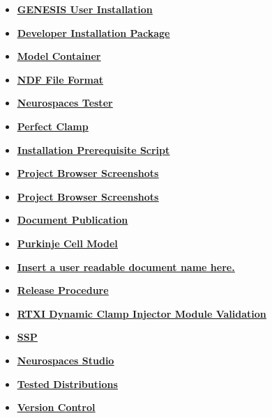 \documentclass[12pt]{article}
\begin{document}
\begin{itemize}
\item \href{../installation-user/installation-user.pdf}{\bf \underline{GENESIS User Installation}}

\item \href{../installer-package/installer-package.pdf}{\bf \underline{Developer Installation Package}}

\item \href{../model-container/model-container.pdf}{\bf \underline{Model Container}}

\item \href{../ndf-file-format/ndf-file-format.pdf}{\bf \underline{NDF File Format}}

\item \href{../neurospaces-tester/neurospaces-tester.pdf}{\bf \underline{Neurospaces Tester}}

\item \href{../pclamp/pclamp.pdf}{\bf \underline{Perfect Clamp}}

\item \href{../prerequisite-script/prerequisite-script.pdf}{\bf \underline{Installation Prerequisite Script}}

\item \href{../project-browser/project-browser.pdf}{\bf \underline{Project Browser Screenshots}}

\item \href{../project-browser-screenshots/project-browser-screenshots.pdf}{\bf \underline{Project Browser Screenshots}}

\item \href{../publication/publication.pdf}{\bf \underline{Document Publication}}

\item \href{../purkinje-cell-model/purkinje-cell-model.pdf}{\bf \underline{Purkinje Cell Model}}

\item \href{../release-expand/release-expand.pdf}{\bf \underline{Insert a user readable document name here.}}

\item \href{../release-procedure/release-procedure.pdf}{\bf \underline{Release Procedure}}

\item \href{../rtxi-injector-validation/rtxi-injector-validation.pdf}{\bf \underline{RTXI Dynamic Clamp Injector Module Validation}}

\item \href{../ssp/ssp.pdf}{\bf \underline{SSP}}

\item \href{../studio/studio.pdf}{\bf \underline{Neurospaces Studio}}

\item \href{../tested-distributions/tested-distributions.pdf}{\bf \underline{Tested Distributions}}

\item \href{../version-control/version-control.pdf}{\bf \underline{Version Control}}


\end{itemize}

\end{document}
